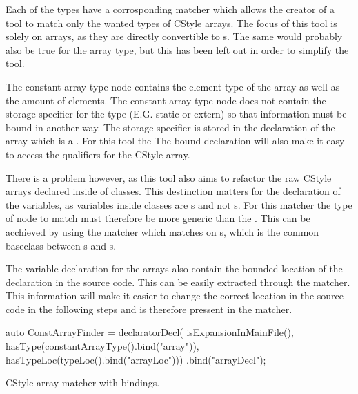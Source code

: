 Each of the types have a corrosponding matcher which allows the creator of a tool to match only the wanted types of CStyle arrays. The focus of this tool is solely on  arrays, as they are directly convertible to s. The same would probably also be true for the  array type, but this has been left out in order to simplify the tool.

The constant array type node contains the element type of the array as well as the amount of elements. The constant array type node does not contain the storage specifier for the type (E.G. static or extern) so that information must be bound in another way. The storage specifier is stored in the declaration of the array which is a . For this tool the  The bound declaration will also make it easy to access the qualifiers for the CStyle array. 

There is a problem however, as this tool also aims to refactor the raw CStyle arrays declared inside of classes. This destinction matters for the declaration of the variables, as variables inside classes are s and not s. For this matcher the type of node to match must therefore be more generic than the . This can be acchieved by using the  matcher which matches on s, which is the common baseclass between s and s.

The variable declaration for the arrays also contain the bounded location of the declaration in the source code. This can be easily extracted through the  matcher. This information will make it easier to change the correct location in the source code in the following steps and is therefore pressent in the matcher.

\begin{listing}[H]
    \begin{cppcode}
auto ConstArrayFinder = 
    declaratorDecl(
        isExpansionInMainFile(),
        hasType(constantArrayType().bind("array")),
        hasTypeLoc(typeLoc().bind("arrayLoc")))
    .bind("arrayDecl");
    \end{cppcode}
    \caption{CStyle array matcher with bindings.}
    \label{code:085tool_ex:CSMatcher}
\end{listing}



